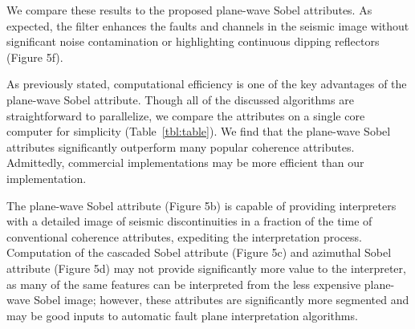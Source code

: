 We compare these results to the proposed plane-wave Sobel attributes.
As expected, the filter enhances the faults and channels in the seismic image without significant noise contamination or highlighting continuous dipping reflectors (Figure 5f).

As previously stated, computational efficiency is one of the key advantages of the plane-wave Sobel attribute.
Though all of the discussed algorithms are straightforward to parallelize, we compare the attributes on a single core computer for simplicity (Table~\ref{tbl:table}). 
We find that the plane-wave Sobel attributes significantly outperform many popular coherence attributes.
Admittedly, commercial implementations may be more efficient than our implementation.

The plane-wave Sobel attribute (Figure 5b) is capable of providing interpreters with a detailed image of seismic discontinuities in a fraction of the time of conventional coherence attributes, expediting the interpretation process.
Computation of the cascaded Sobel attribute (Figure 5c) and azimuthal Sobel attribute (Figure 5d) may not provide significantly more value to the interpreter, as many of the same features can be interpreted from the less expensive plane-wave Sobel image; however, these attributes are significantly more segmented and may be good inputs to automatic fault plane interpretation algorithms.


